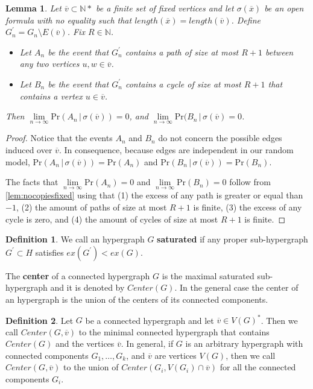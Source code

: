 \documentclass[12pt,notitlepage,a4paper]{article}
\newtheorem{lemma}{Lemma}[section]
\theoremstyle{definition}
\newtheorem{definition}{Definition}[section]
\newcommand{\N}{\mathbb{N}}
\newcommand{\Ln}{\lim\limits_{n\to \infty}}
\begin{document}
\begin{lemma}
	Let $\overline{v} \subset \N*$ be a finite set of fixed vertices and let 
	$\sigma(\overline{x})$ be an open formula with no equality such that
	$length(\overline{x})=length(\overline{v})$. 
	Define $G_n^\prime=G_n \setminus E(\overline{v})$. Fix $R\in \N$. 
	\begin{itemize}
		\item Let $A_n$ be the event that $G^\prime_n$ contains a path of size
		at most	$R+1$ between any two vertices $u,w\in \overline{v}$.
		\item Let $B_n$ be the event
		that $G^\prime_n$ contains a cycle of size at most $R+1$ 
		that contains a vertex $u\in \overline{v}$.
	\end{itemize}
	Then $\Ln \mathrm{Pr}(A_n \, | \, \sigma(\overline{v}))=0$, and 
	$\Ln \mathrm{Pr}(B_n \, | \, \sigma(\overline{v})=0$. 
\end{lemma}
\begin{proof}
	Notice that the events $A_n$ and $B_n$ do not concern the possible edges
	induced over $\overline{v}$. In consequence, because edges are independent
	in our random model, 
	$\mathrm{Pr}(A_n \, | \, \sigma(\overline{v}))
	=\mathrm{Pr}(A_n)$ and 
	$\mathrm{Pr}(B_n \, | \, \sigma(\overline{v}))
	=\mathrm{Pr}(B_n)$.\par
	The facts that $\Ln \mathrm{Pr}(A_n)=0$ and 
	$\Ln \mathrm{Pr}(B_n)=0$ follow
	from \cref{lem:nocopiesfixed} using that 
	(1) the excess of any path is greater or equal than $-1$,
	(2) the amount of paths of size at most $R+1$ is finite,
	(3) the excess of any cycle is zero, and (4) the
	amount of cycles of size at most $R+1$ is finite. 
\end{proof}

\begin{definition}
	We call an hypergraph $G$ \textbf{saturated} if any proper 
	sub-hypergraph $G^\prime \subset H$ satisfies $ex(G^\prime)<ex(G)$. \par
	The \textbf{center} of a connected hypergraph $G$ is the maximal saturated
	sub-hypergraph and it is denoted by $Center(G)$. In the general case 
	the center of an hypergraph is the union of the
	centers of its connected components. 
\end{definition}

\begin{definition}
	Let $G$ be a connected hypergraph and let $\overline{v}\in V(G)^*$.
	Then we call $Center(G, \overline{v})$ to the minimal connected hypergraph
	that contains $Center(G)$ and the vertices $\overline{v}$. In general, if 
	$G$ is an arbitrary hypergraph with connected components $G_1, \dots, G_k$,
	and $\overline{v}$ are vertices $V(G)$, then we call 
	$Center(G, \overline{v})$ to the union of $Center(G_i, V(G_i)\cap
	\overline{v})$ for all the connected components $G_i$.
\end{definition}
\end{document}
